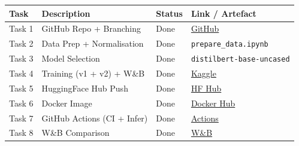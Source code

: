 \documentclass[11pt,a4paper]{article}
\begin{document}
\renewcommand{\arraystretch}{1.4}
\begin{tabular}{llll}
\toprule
\textbf{Task} & \textbf{Description} & \textbf{Status} & \textbf{Link / Artefact} \\
\midrule
Task 1  & GitHub Repo + Branching     & Done & \href{https://github.com/riteshmaury-iitj/group13-assignment-mlops}{GitHub} \\
Task 2  & Data Prep + Normalisation   & Done & \texttt{prepare\_data.ipynb} \\
Task 3  & Model Selection             & Done & \texttt{distilbert-base-uncased} \\
Task 4  & Training (v1 + v2) + W\&B   & Done & \href{https://www.kaggle.com/code/kyuvarajg25ait2054/group13-ag-news-k}{Kaggle} \\
Task 5  & HuggingFace Hub Push        & Done & \href{https://huggingface.co/YuvarajK-g25ait2054/ag-news-distilbert}{HF Hub} \\
Task 6  & Docker Image                & Done & \href{https://hub.docker.com/r/yuvarajkg25ait2054/ag-news-classifier}{Docker Hub} \\
Task 7  & GitHub Actions (CI + Infer) & Done & \href{https://github.com/riteshmaury-iitj/group13-assignment-mlops/actions}{Actions} \\
Task 8  & W\&B Comparison             & Done & \href{https://wandb.ai/g25ait2054-iit-jodhpur/mlops-assignment3}{W\&B} \\
\bottomrule
\end{tabular}
\end{document}
